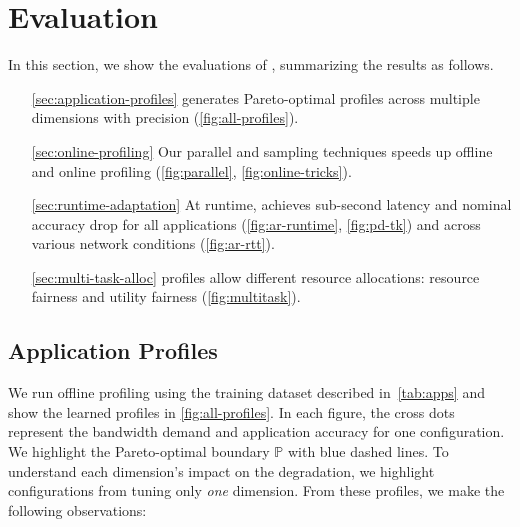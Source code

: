 \section{Evaluation}
\label{sec:evaluation}

In this section, we show the evaluations of \awstream{}, summarizing the results
as follows.

\begin{itemize}[leftmargin=1.5cm]
\item[\autoref{sec:application-profiles}] \awstream{} generates Pareto-optimal
  profiles across multiple dimensions with precision
  (\autoref{fig:all-profiles}).
\item[\autoref{sec:online-profiling}] Our parallel and sampling techniques
  speeds up offline and online profiling (\autoref{fig:parallel},
  \autoref{fig:online-tricks}).
\item[\autoref{sec:runtime-adaptation}] At runtime, \awstream{} achieves
  sub-second latency and nominal accuracy drop for all applications
  (\autoref{fig:ar-runtime}, \autoref{fig:pd-tk}) and across various network
  conditions (\autoref{fig:ar-rtt}).
\item[\autoref{sec:multi-task-alloc}] \awstream{} profiles allow different
  resource allocations: resource fairness and utility fairness
  (\autoref{fig:multitask}).
\end{itemize}

\subsection{Application Profiles}
\label{sec:application-profiles}

We run offline profiling using the training dataset described
in~\autoref{tab:apps} and show the learned profiles in
\autoref{fig:all-profiles}. In each figure, the cross dots represent the
bandwidth demand and application accuracy for one configuration. We highlight
the Pareto-optimal boundary $\mathbb{P}$ with blue dashed lines. To understand
each dimension's impact on the degradation, we highlight configurations from
tuning only \textit{one} dimension. From these profiles, we make the following
observations:

